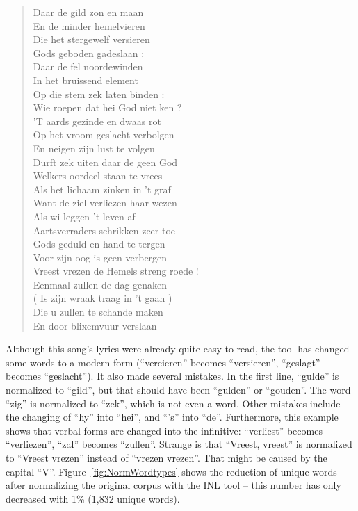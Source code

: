 \begin{quote}
	Daar de gild zon en maan\\
	En de minder hemelvieren\\
	Die het stergewelf versieren\\
	Gods geboden gadeslaan :\\
	Daar de fel noordewinden\\
	In het bruissend element\\
	Op die stem zek laten binden :\\
	Wie roepen dat hei God niet ken ?\\
	
	'T aards gezinde en dwaas rot\\
	Op het vroom geslacht verbolgen\\
	En neigen zijn lust te volgen\\
	Durft zek uiten daar de geen God\\
	Welkers oordeel staan te vrees\\
	Als het lichaam zinken in 't graf\\
	Want de ziel verliezen haar wezen\\
	Als wi leggen 't leven af\\
	
	Aartsverraders schrikken zeer toe\\
	Gods geduld en hand te tergen\\
	Voor zijn oog is geen verbergen\\
	Vreest vrezen de Hemels streng roede !\\
	Eenmaal zullen de dag genaken\\
	( Is zijn wraak traag in 't gaan )\\
	Die u zullen te schande maken\\
	En door blixemvuur verslaan
\end{quote}

\noindent Although this song's lyrics were already quite easy to read, the tool has changed some words to a modern form (\enquote{vercieren} becomes \enquote{versieren}, \enquote{geslagt} becomes \enquote{geslacht}). It also made several mistakes. In the first line, \enquote{gulde} is normalized to \enquote{gild}, but that should have been \enquote{gulden} or \enquote{gouden}. The word \enquote{zig} is normalized to \enquote{zek}, which is not even a word. Other mistakes include the changing of \enquote{hy} into \enquote{hei}, and \enquote{'s} into \enquote{de}. Furthermore, this example shows that verbal forms are changed into the infinitive: \enquote{verliest} becomes \enquote{verliezen}, \enquote{zal} becomes \enquote{zullen}. Strange is that \enquote{Vreest, vreest} is normalized to \enquote{Vreest vrezen} instead of \enquote{vrezen vrezen}. That might be caused by the capital \enquote{V}. Figure~\ref{fig:NormWordtypes} shows the reduction of unique words after normalizing the original corpus with the INL tool -- this number has only decreased with 1\% (1,832 unique words).

